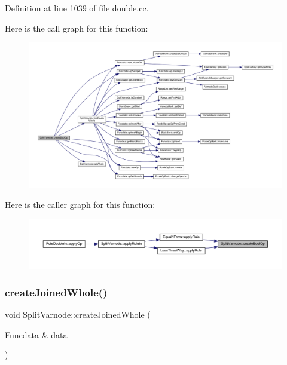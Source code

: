 Definition at line 1039 of file double.\+cc.

Here is the call graph for this function\+:
\nopagebreak
\begin{figure}[H]
\begin{center}
\leavevmode
\includegraphics[width=350pt]{class_split_varnode_a7cc1768236a8f0edf17b3b8e31bb2eb4_cgraph}
\end{center}
\end{figure}
Here is the caller graph for this function\+:
\nopagebreak
\begin{figure}[H]
\begin{center}
\leavevmode
\includegraphics[width=350pt]{class_split_varnode_a7cc1768236a8f0edf17b3b8e31bb2eb4_icgraph}
\end{center}
\end{figure}
\mbox{\label{class_split_varnode_ad1c85dd3deb4c5e9a18e0c815feec95a}} 
\subsubsection{\texorpdfstring{createJoinedWhole()}{createJoinedWhole()}}
{\footnotesize\ttfamily void Split\+Varnode\+::create\+Joined\+Whole (\begin{DoxyParamCaption}\item[{\mbox{\hyperlink{class_funcdata}{Funcdata}} \&}]{data }\end{DoxyParamCaption})}



